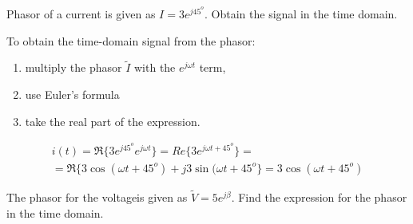 \documentclass{ximera}
\begin{document}
\begin{example}
Phasor of a current is  given as $I=3 e^{j 45^o}$. Obtain the signal in the time domain.


\begin{explanation}
  To obtain the time-domain signal from the phasor:
\begin{enumerate}
\item multiply the phasor $\tilde{I}$ with the $ e^{j\omega t}$ term, 
\item use Euler's formula 
\item take the real part of the expression.
\end{enumerate}  
   


\begin{eqnarray}
i(t) = \Re\{ 3 e^{ j 45^o}  e^{j\omega t} \} =  Re\{3  e^{j \omega t + 45^o}  \} = \nonumber \\ = \Re \{ 3 \cos (\omega t + 45^o ) + j 3 \sin (\omega t + 45^o \} = 3  \cos (\omega t + 45^o ) \label{phtotd}
\end{eqnarray}


\end{explanation}


\end{example}


\begin{question}
The phasor for the  voltageis given as $\tilde{V}= 5 e^{ j \beta} $. Find the expression for the phasor in the time domain.
\begin{multipleChoice}  
\end{multipleChoice} 
\end{question}
\end{document}
